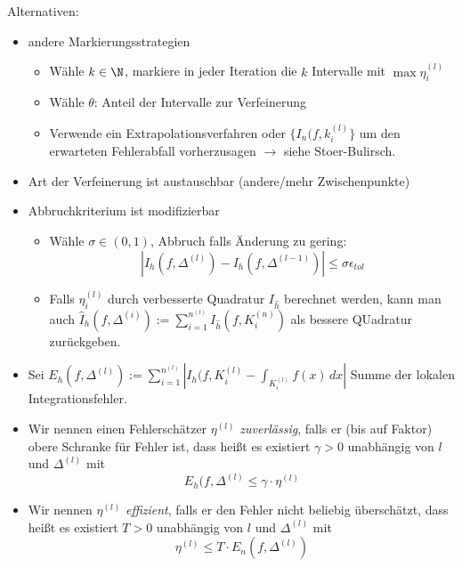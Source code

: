 \documentclass[11pt]{scrbook}
\begin{document}
\begin{note*}
	Alternativen:
	\begin{itemize}
		\item andere Markierungsstrategien
			\begin{itemize}
				\item Wähle $k\in \N$, markiere in jeder Iteration die $k$ Intervalle mit $\max \eta_i^{(l)}$
				\item Wähle $\theta$: Anteil der Intervalle zur Verfeinerung
				\item Verwende ein Extrapolationsverfahren oder $\{I_n(f, k_i^{(l)}\}$ um den erwarteten Fehlerabfall vorherzusagen $\rightarrow$ siehe Stoer-Bulirsch.
		\end{itemize}
	\item Art der Verfeinerung ist austauschbar (andere/mehr Zwischenpunkte)
	\item Abbruchkriterium ist modifizierbar
		\begin{itemize}
			\item Wähle $\sigma\in (0,1)$, Abbruch falls Änderung zu gering:
				\[
					|I_h(f,\Delta^{(l)})-I_{h}(f, \Delta^{(l-1)} )|\le \sigma \epsilon_{tol}
				\]
			\item Falls $\eta_i^{(l)}$ durch verbesserte Quadratur $I_{\hat h}$ berechnet werden, kann man auch $\hat I_h(f, \Delta^{(i)}):=\sum_{i=1}^{n^{(l)}} I_{\hat h} (f, K_i^{(n)})$ als bessere QUadratur zurückgeben.
		\end{itemize}
\end{itemize}
\end{note*}
\begin{note*}
	\begin{itemize}
		\item Sei $E_h(f, \Delta^{(l)}):= \sum_{i=1}^{n^{(l)}} |I_h(f,K_i^{(l)} - \int_{K_i^{(l)}} f(x)\, dx|$ Summe der lokalen Integrationsfehler.
		\item Wir nennen einen Fehlerschätzer $\eta^{(l)}$ \emph{zuverlässig}, falls er (bis auf Faktor) obere Schranke für Fehler ist, dass heißt es existiert $\gamma >0$ unabhängig von $l$ und $\Delta^{(l)}$ mit 
			\[
				E_h(f, \Delta^{(l)}\le \gamma \cdot \eta^{(l)}
			\]
		\item Wir nennen $\eta^{(l)}$ \emph{effizient}, falls er den Fehler nicht beliebig überschätzt, dass heißt es existiert $T>0$ unabhängig von $l$ und $\Delta^{(l)}$ mit 
			\[
				\eta^{(l)}\le T \cdot E_n(f, \Delta^{(l)})
			\]
	\end{itemize}
\end{note*}
\end{document}
